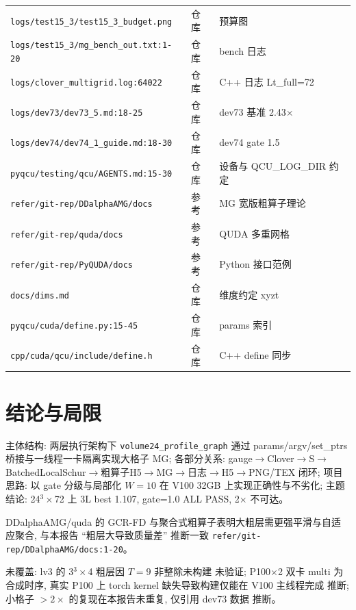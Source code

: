 \documentclass[UTF8]{ctexart}
\begin{document}
\begin{xltabular}{\textwidth}{llX}
\texttt{\nolinkurl{logs/test15_3/test15_3_budget.png}} & 仓库 & 预算图 \\
\texttt{\nolinkurl{logs/test15_3/mg_bench_out.txt:1-20}} & 仓库 & bench 日志 \\
\texttt{\nolinkurl{logs/clover_multigrid.log:64022}} & 仓库 & C++ 日志 Lt\_full=72 \\
\texttt{\nolinkurl{logs/dev73/dev73_5.md:18-25}} & 仓库 & dev73 基准 2.43$\times$ \\
\texttt{\nolinkurl{logs/dev74/dev74_1_guide.md:18-30}} & 仓库 & dev74 gate 1.5 \\
\texttt{\nolinkurl{pyqcu/testing/qcu/AGENTS.md:15-30}} & 仓库 & 设备与 QCU\_LOG\_DIR 约定 \\
\texttt{\nolinkurl{refer/git-rep/DDalphaAMG/docs}} & 参考 & MG 宽版粗算子理论 \\
\texttt{\nolinkurl{refer/git-rep/quda/docs}} & 参考 & QUDA 多重网格 \\
\texttt{\nolinkurl{refer/git-rep/PyQUDA/docs}} & 参考 & Python 接口范例 \\
\texttt{\nolinkurl{docs/dims.md}} & 仓库 & 维度约定 xyzt \\
\texttt{\nolinkurl{pyqcu/cuda/define.py:15-45}} & 仓库 & params 索引 \\
\texttt{\nolinkurl{cpp/cuda/qcu/include/define.h}} & 仓库 & C++ define 同步 \\
\bottomrule
\end{xltabular}

\section{结论与局限}
\begin{conclbox}
主体结构: 两层执行架构下 \texttt{\nolinkurl{volume24_profile_graph}} 通过 params/argv/set\_ptrs 桥接与一线程一卡隔离实现大格子 MG; 各部分关系: gauge$\to$Clover$\to$S$\to$BatchedLocalSchur$\to$粗算子H5$\to$MG$\to$日志$\to$H5$\to$PNG/TEX 闭环; 项目思路: 以 gate 分级与局部化 $W=10$ 在 V100 32GB 上实现正确性与不劣化; 主题结论: 24$^3\times$72 上 3L best 1.107, gate=1.0 ALL PASS, 2$\times$ 不可达。
\end{conclbox}
\begin{refbox}
DDalphaAMG/quda 的 GCR-FD 与聚合式粗算子表明大粗层需更强平滑与自适应聚合, 与本报告 ``粗层大导致质量差'' 推断一致 \textcolor{evidence}{\texttt{\nolinkurl{refer/git-rep/DDalphaAMG/docs:1-20}}}。
\end{refbox}
\begin{warnbox}
未覆盖: lv3 的 3$^3\times$4 粗层因 $T=9$ 非整除未构建 \textcolor{warn}{未验证}; P100$\times$2 双卡 multi 为合成时序, 真实 P100 上 torch kernel 缺失导致构建仅能在 V100 主线程完成 \textcolor{warn}{推断}; 小格子 $>2\times$ 的复现在本报告未重复, 仅引用 dev73 数据 \textcolor{warn}{推断}。
\end{warnbox}
\end{document}
